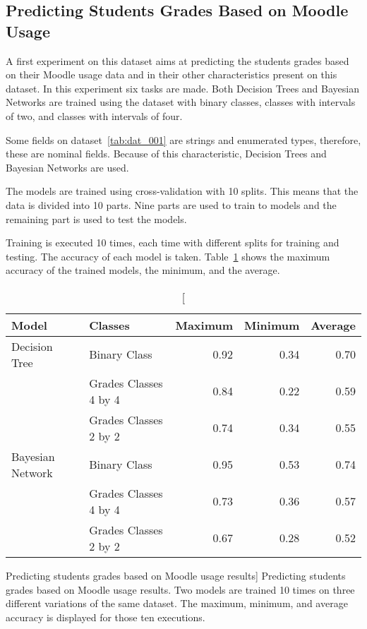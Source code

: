 \subsection{Predicting Students Grades Based on Moodle Usage}

A first experiment on this dataset aims at predicting the students grades based
on their Moodle usage data and in their other characteristics present on this
dataset. In this experiment six tasks are made. Both Decision Trees and Bayesian
Networks are trained using the dataset with binary classes, classes with
intervals of two, and classes with intervals of four.

Some fields on dataset~\ref{tab:dat_001} are strings and enumerated types,
therefore, these are nominal fields. Because of this characteristic, Decision
Trees and Bayesian Networks are used.

The models are trained using cross-validation with 10 splits. This means that
the data is divided into 10 parts. Nine parts are used to train to models and
the remaining part is used to test the models.

Training is executed 10 times, each time with different splits for training and
testing. The accuracy of each model is taken. Table~\ref{tab:exp_001_res} shows
the maximum accuracy of the trained models, the minimum, and the average.

\begin{table}[h!]
    \centering

    \begin{tabular}{| l | l | r | r | r |}
        \hline
        \textbf{Model} & \textbf{Classes} & \textbf{Maximum} & \textbf{Minimum} & \textbf{Average} \\ \hline
        Decision Tree    & Binary Class          & 0.92 & 0.34 & 0.70 \\
                         & Grades Classes 4 by 4 & 0.84 & 0.22 & 0.59 \\
                         & Grades Classes 2 by 2 & 0.74 & 0.34 & 0.55 \\ \hline
        Bayesian Network & Binary Class          & 0.95 & 0.53 & 0.74 \\
                         & Grades Classes 4 by 4 & 0.73 & 0.36 & 0.57 \\
                         & Grades Classes 2 by 2 & 0.67 & 0.28 & 0.52 \\ \hline
    \end{tabular}

    \caption
        [Predicting students grades based on Moodle usage results]
        {Predicting students grades based on Moodle usage results. Two models
        are trained 10 times on three different variations of the same dataset.
        The maximum, minimum, and average accuracy is displayed for those ten
        executions.}

    \label{tab:exp_001_res}
\end{table}

